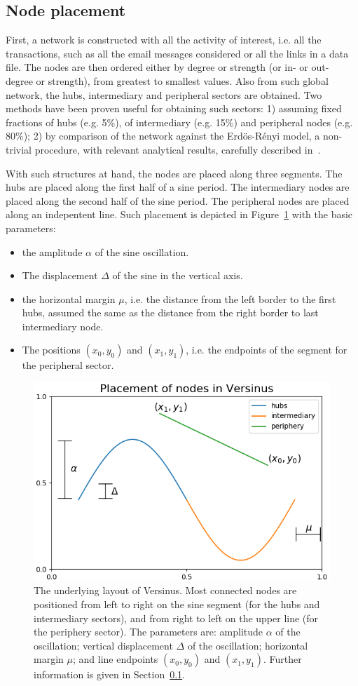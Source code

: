 \documentclass[runningheads]{llncs}
\begin{document}
\subsection{Node placement}\label{sec:pla}
First, a network is constructed with all the activity of interest, i.e. all the transactions, such as all the email messages considered or all the links in a data file.
The nodes are then ordered either by degree or strength (or in- or out- degree or strength), from greatest to smallest values.
Also from such global network, the hubs, intermediary and peripheral sectors are obtained. Two methods have been proven useful for obtaining such sectors: 1) assuming fixed fractions of hubs (e.g. 5\%), of intermediary (e.g. 15\%) and peripheral nodes (e.g. 80\%); 2) by comparison of the network against the Erdös-Rényi model, a non-trivial procedure, with relevant analytical results, carefully described in~\cite{stab}.

With such structures at hand, the nodes are placed along three segments.
The hubs are placed along the first half of a sine period.
The intermediary nodes are placed along the second half of the sine period.
The peripheral nodes are placed along an indepentent line.
Such placement is depicted in Figure~\ref{fig:glob} with
the basic parameters:
\begin{itemize}
  \item the amplitude $\alpha$ of the sine oscillation.
  \item The displacement $\Delta$ of the sine in the vertical axis.
  \item the horizontal margin $\mu$, i.e. the distance from the left border to the first hubs, assumed the same as the distance from the right border to last intermediary node.
  \item The positions $(x_0,y_0)$ and $(x_1,y_1)$, i.e. the endpoints of the segment for the peripheral sector.
\end{itemize}

\begin{figure}[!h]\centering
\includegraphics[width=.7\textwidth]{nodePositioning}
  \caption{The underlying layout of Versinus. Most connected nodes are positioned from left to right on the sine segment (for the hubs and intermediary sectors), and from right to left on the upper line (for the periphery sector). The parameters are: amplitude $\alpha$ of the oscillation; vertical displacement $\Delta$ of the oscillation; horizontal margin $\mu$; and line endpoints $(x_0, y_0)$ and $(x_1, y_1)$.
   Further information is given in Section~\ref{sec:pla}.
  }\label{fig:glob}
\end{figure}
\end{document}
